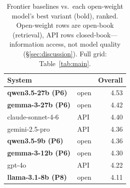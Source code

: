 \begin{table}[t]\centering\footnotesize
\begin{tabular}{@{}llr@{}}
\toprule
System & & Overall \\
\midrule
\textbf{qwen3.5-27b (P6)} & open & 4.53 \\
\textbf{gemma-3-27b (P6)} & open & 4.42 \\
claude-sonnet-4-6 & API & 4.40 \\
gemini-2.5-pro & API & 4.36 \\
\textbf{qwen3.5-9b (P6)} & open & 4.36 \\
\textbf{gemma-3-12b (P6)} & open & 4.30 \\
gpt-4o & API & 4.22 \\
\textbf{llama-3.1-8b (P8)} & open & 4.11 \\
\bottomrule
\end{tabular}
\caption{Frontier baselines vs.\ each open-weight model's best variant (bold), ranked. Open-weight rows are open-book (retrieval), API rows closed-book---information access, not model quality (\S\ref{sec:discussion}). Full grid: Table~\ref{tab:main}.}
\label{tab:frontier}
\end{table}

